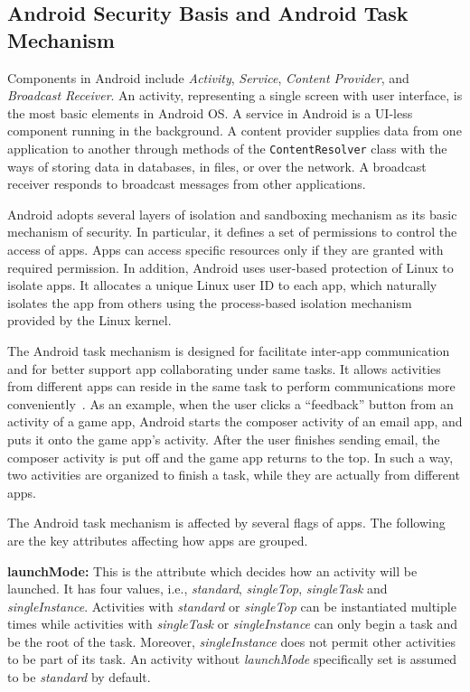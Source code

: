 \documentclass[letterpaper,12pt]{article}
\begin{document}
\subsection{Android Security Basis and Android Task Mechanism}
Components in Android include {\em Activity}, {\em Service}, {\em
  Content Provider}, and {\em Broadcast Receiver}. An activity,
representing a single screen with user interface, is the most basic
elements in Android OS. A service in Android is a UI-less component
running in the background. A content provider supplies data from one
application to another through methods of the \texttt{ContentResolver}
class with the ways of storing data in databases, in files, or over
the network. A broadcast receiver responds to broadcast messages from
other applications.

Android adopts several layers of isolation and sandboxing mechanism as
its basic mechanism of security. In particular, it defines a set of
permissions to control the access of apps. Apps can access specific
resources only if they are granted with required permission.  In
addition, Android uses user-based protection of Linux to isolate
apps. It allocates a unique Linux user ID to each app, which naturally
isolates the app from others using the process-based isolation
mechanism provided by the Linux kernel.

The Android task mechanism is designed for facilitate inter-app
communication and for better support app collaborating under same
tasks. It allows activities from different apps can reside in the same
task to perform communications more conveniently~\cite{taskdoc}.  As
an example, when the user clicks a ``feedback'' button from an
activity of a game app, Android starts the composer activity of an
email app, and puts it onto the game app's activity.  After the user
finishes sending email, the composer activity is put off and the game
app returns to the top.  In such a way, two activities are organized
to finish a task, while they are actually from different apps.


The Android task mechanism is affected by several flags of apps. The
following are the key attributes affecting how apps are grouped.

\textbf{launchMode:} This is the attribute which decides how an activity
will be launched. It has four values, i.e., \textit{standard},
\textit{singleTop}, \textit{singleTask} and
\textit{singleInstance}. Activities with \textit{standard} or
\textit{singleTop} can be instantiated multiple times while activities
with \textit{singleTask} or \textit{singleInstance} can only begin a
task and be the root of the task. Moreover, \textit{singleInstance}
does not permit other activities to be part of its task. An
activity without \textit{launchMode} specifically set is
assumed to be \textit{standard} by default.
\end{document}
